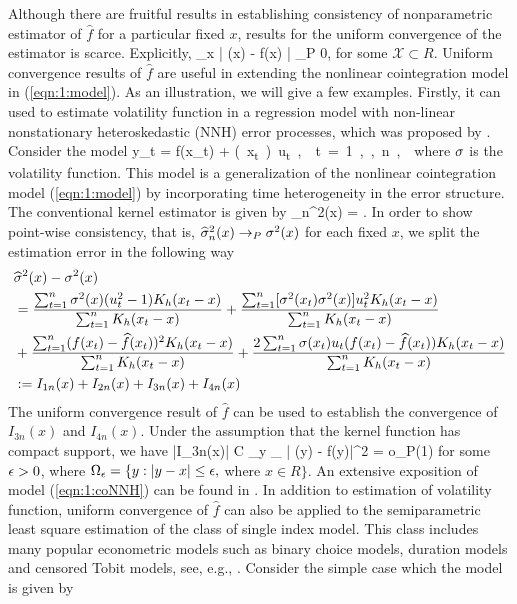 Although there are fruitful results in establishing consistency of nonparametric estimator of $\widehat{f}$ for a particular fixed $x$, results for the uniform convergence of the estimator is scarce. Explicitly,
\bestar
\sup_{x \in {}} | (x) - f(x) | \to_P 0,
\eestar
for some $\mathcal{X} \subset R$. Uniform convergence results of $\widehat{f}$ are useful in extending the nonlinear cointegration model in (\ref{eqn:1:model}). As an illustration, we will give a few examples. Firstly, it can used to estimate volatility function in a regression model with non-linear nonstationary heteroskedastic (NNH) error processes, which was proposed  by \cite{park2002}. Consider the model
\be {}
y_t = f(x_t) + \si(x_t) u_t, \quad t = 1, ..., n,
\ee
where $\sigma$ is the volatility function. This model is a generalization of the nonlinear cointegration model (\ref{eqn:1:model}) by incorporating time heterogeneity in the error structure. The conventional kernel estimator is given by
\bestar
\widehat{\si}_n^2(x) = .
\eestar
In order to show point-wise consistency, that is, $\widehat{\sigma}^2_n(x) \to_P \sigma^2(x)$ for each fixed $x$, we split the estimation error in the following way
\begin{align}
&\widehat{\sigma}^2(x) - \sigma^2(x) \nonumber\\
&=\frac{\sum_{t = 1}^n \sigma^2(x) (u_t^2 - 1) K_h(x_t - x)}{\sum_{t = 1}^n K_h(x_t - x)} + \frac{\sum_{t = 1}^n [\sigma^2(x_t) \sigma^2(x) ] u_t^2 K_h(x_t - x)}{\sum_{t = 1}^n K_h(x_t - x)} \nonumber\\
&+\frac{\sum_{t = 1}^n (f(x_t) - \widehat{f}(x_t))^2 K_h(x_t - x)}{\sum_{t = 1}^n K_h(x_t - x)} + \frac{2\sum_{t = 1}^n \sigma(x_t) u_t (f(x_t) - \widehat{f}(x_t))  K_h(x_t - x)}{\sum_{t = 1}^n K_h(x_t - x)} \nonumber\\
&:= I_{1n}(x) + I_{2n}(x) + I_{3n}(x) + I_{4n}(x) \nonumber
\end{align}
The uniform convergence result of $\widehat{f}$ can be used to establish the convergence of $I_{3n}(x)$ and $I_{4n}(x)$. Under the assumption that the kernel function has compact support, we have
\bestar
|I_{3n}(x)| \le C  \sup_{y \in \Omega_\ep} | (y) - f(y)|^2 = o_P(1)
\eestar
for some $\epsilon > 0$, where $\Omega_\epsilon = \{y : |y - x | \le \epsilon, $ where $ x \in R\}$. An extensive exposition of model (\ref{eqn:1:coNNH}) can be found in \cite{wangwang2012}. In addition to estimation of volatility function, uniform convergence of $\widehat{f}$ can also be applied to the semiparametric least square estimation of the class of single index model. This class includes many popular econometric models such as binary choice models, duration models and censored Tobit models, see, e.g., \cite{ichimura1993}. Consider the simple case which the model is given by
